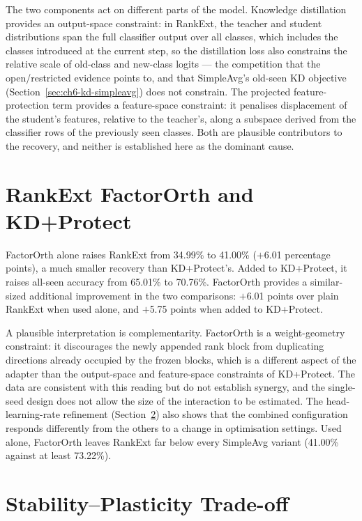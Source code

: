 The two components act on different parts of the model. Knowledge
distillation provides an output-space constraint: in RankExt, the teacher
and student distributions span the full classifier output over all classes, which
includes the classes introduced at the current step, so the distillation
loss also constrains the relative scale of old-class and new-class logits
--- the competition that the open/restricted evidence points to, and that
SimpleAvg's old-seen KD objective (Section~\ref{sec:ch6-kd-simpleavg}) does
not constrain. The projected feature-protection term provides a
feature-space constraint: it penalises displacement of the student's
features, relative to the teacher's, along a subspace derived from the
classifier rows of the previously seen classes. Both are plausible
contributors to the recovery, and neither is established here as the
dominant cause.

\section{RankExt FactorOrth and KD+Protect}
\label{sec:ch6-factororth}

FactorOrth alone raises RankExt from 34.99\% to 41.00\% ($+$6.01 percentage
points), a much smaller recovery than KD+Protect's. Added to KD+Protect, it
raises all-seen accuracy from 65.01\% to 70.76\%. FactorOrth provides a
similar-sized additional improvement in the two comparisons: $+$6.01 points
over plain RankExt when used alone, and $+$5.75 points when added to
KD+Protect.

A plausible interpretation is complementarity. FactorOrth is a
weight-geometry constraint: it discourages the newly appended rank block
from duplicating directions already occupied by the frozen blocks, which is
a different aspect of the adapter than the output-space and feature-space
constraints of KD+Protect. The data are consistent with this reading but do
not establish synergy, and the single-seed design does not allow the size
of the interaction to be estimated. The head-learning-rate refinement
(Section~\ref{sec:ch6-stability-plasticity}) also shows that the combined
configuration responds differently from the others to a change in
optimisation settings. Used alone, FactorOrth leaves RankExt far below every
SimpleAvg variant (41.00\% against at least 73.22\%).

\section{Stability--Plasticity Trade-off}
\label{sec:ch6-stability-plasticity}

